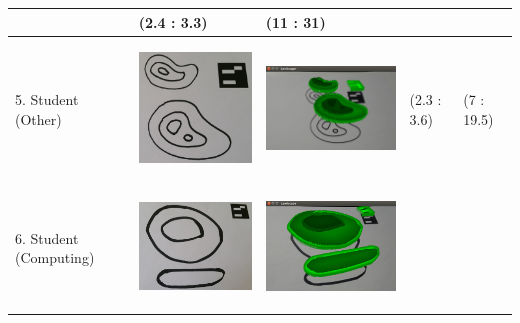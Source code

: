 \documentclass[11pt]{article}
\begin{document}
\begin{landscape}
\begin{longtable}{p{}| p{}| p{} | p{} |p{}}
							& (2.4 : 3.3)
							& (11 : 31)\\
\hline
5. Student (Other) & \begin{center}\includegraphics[scale=0.5]{pics/usertesting/5.png}\end{center} 
							& \begin{center}\includegraphics[scale=0.5]{pics/usertesting/5render.png}\end{center} 
							& (2.3 : 3.6)
							& (7 : 19.5)\\
\hline
6. Student (Computing) & \begin{center}\includegraphics[scale=0.5]{pics/usertesting/6.png}\end{center} 
							& \begin{center}\includegraphics[scale=0.5]{pics/usertesting/6render.png}\end{center} 

\end{longtable}
\end{landscape}
\end{document}
